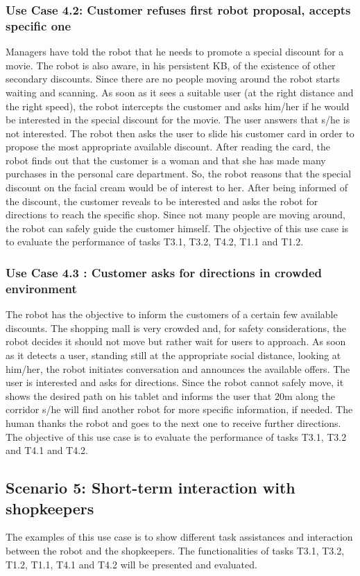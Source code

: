 \subsubsection*{Use Case 4.2: Customer refuses first robot proposal, accepts specific one} Managers have told the robot that he needs to promote a special discount
for a movie. The robot is also aware, in his persistent KB, of the
existence of other secondary discounts. Since there are no people
moving around the robot starts waiting and scanning. As soon as it
sees a suitable user (at the right distance and the right speed),
the robot intercepts the customer and asks him/her if he would be interested
in the special discount for the movie. The user answers that s/he is not interested.
The robot then asks the user to slide his customer card in order to
propose the most appropriate available discount. After reading the
card, the robot finds out that the customer is a woman and that she
has made many purchases in the personal care department. 
So, the robot reasons that the special discount on the facial cream would be of interest
to her. After being informed of the discount, the customer reveals
to be interested and asks the robot for directions to reach the specific
shop. Since not many people are moving around, the robot can safely
guide the customer himself.
The objective of this use case is to evaluate the performance of tasks T3.1, T3.2, T4.2, T1.1 and T1.2.

\subsubsection*{Use Case 4.3 : Customer asks for directions in crowded environment} The robot has the objective to inform the customers of a certain few
available discounts. The shopping mall is very crowded and, for safety
considerations, the robot decides it should not move but rather wait
for users to approach. As soon as it detects a user, standing still at
the appropriate social distance, looking at him/her, the robot initiates
conversation and announces the available offers. The user is interested
and asks for directions. Since the robot cannot safely move, it shows
the desired path on his tablet and informs the user that 20m along
the corridor s/he will find another robot for more specific information,
if needed. The human thanks the robot and goes to the next one to
receive further directions.
The objective of this use case is to evaluate the performance of tasks T3.1, T3.2 and T4.1 and T4.2.

\subsection{Scenario 5: Short-term interaction with shopkeepers}
The examples of this use case is to show different task assistances and interaction between the robot and the shopkeepers. The functionalities of tasks T3.1, T3.2, T1.2, T1.1, T4.1 and T4.2 will be presented and evaluated. 


